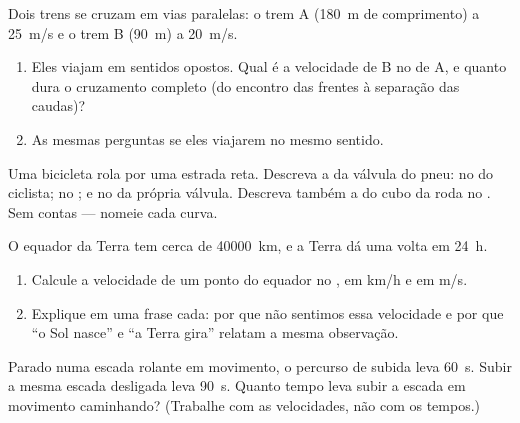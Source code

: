 \begin{exercise}[$\star\star$]\label{exo:g10:relative-motion:8}
Dois trens se cruzam em vias paralelas: o trem A (\qty{180}{m} de
comprimento) a \qty{25}{m/s} e o trem B (\qty{90}{m}) a \qty{20}{m/s}.
\begin{enumerate}
  \item Eles viajam em sentidos opostos. Qual é a velocidade de B no
         de A, e quanto dura o cruzamento completo (do
        encontro das frentes à separação das caudas)?
  \item As mesmas perguntas se eles viajarem no mesmo sentido.
\end{enumerate}
\end{exercise}

\begin{exercise}[$\star\star$]\label{exo:g10:relative-motion:9}
Uma bicicleta rola por uma estrada reta. Descreva a  da válvula
do pneu: no  do ciclista; no ; e no
 da própria válvula. Descreva também a  do cubo da
roda no . Sem contas --- nomeie cada curva.
\end{exercise}

\begin{exercise}[$\star\star$]\label{exo:g10:relative-motion:10}
O equador da Terra tem cerca de \qty{40000}{km}, e a Terra dá uma volta
em \qty{24}{h}.
\begin{enumerate}
  \item Calcule a velocidade de um ponto do equador no , em \unit{km/h} e em \unit{m/s}.
  \item Explique em uma frase cada: por que não sentimos essa velocidade
        e por que ``o Sol nasce'' e ``a Terra gira'' relatam a mesma
        observação.
\end{enumerate}
\end{exercise}

\begin{exercise}[$\star\star$]\label{exo:g10:relative-motion:11}
Parado numa escada rolante em movimento, o percurso de subida leva
\qty{60}{s}. Subir a mesma escada desligada leva \qty{90}{s}. Quanto
tempo leva subir a escada em movimento caminhando? (Trabalhe com as
velocidades, não com os tempos.)
\end{exercise}

